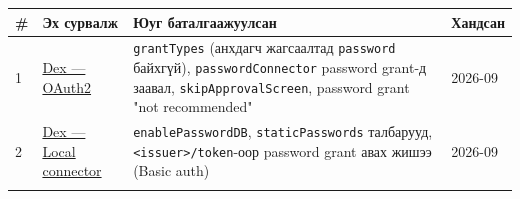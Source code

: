 \begingroup\scriptsize\begin{longtable}[]{@{}llll@{}}
\toprule
\begin{minipage}[b]{0.22\columnwidth}\raggedright
\#\strut
\end{minipage} & \begin{minipage}[b]{0.22\columnwidth}\raggedright
Эх сурвалж\strut
\end{minipage} & \begin{minipage}[b]{0.22\columnwidth}\raggedright
Юуг баталгаажуулсан\strut
\end{minipage} & \begin{minipage}[b]{0.22\columnwidth}\raggedright
Хандсан\strut
\end{minipage}\tabularnewline
\midrule
\endhead
\begin{minipage}[t]{0.22\columnwidth}\raggedright
1\strut
\end{minipage} & \begin{minipage}[t]{0.22\columnwidth}\raggedright
\href{https://dexidp.io/docs/configuration/oauth2/}{Dex --- OAuth2}\strut
\end{minipage} & \begin{minipage}[t]{0.22\columnwidth}\raggedright
\texttt{grantTypes} (анхдагч жагсаалтад \texttt{password} байхгүй), \texttt{passwordConnector} password grant-д заавал, \texttt{skipApprovalScreen}, password grant "not recommended"\strut
\end{minipage} & \begin{minipage}[t]{0.22\columnwidth}\raggedright
2026-09\strut
\end{minipage}\tabularnewline
\begin{minipage}[t]{0.22\columnwidth}\raggedright
2\strut
\end{minipage} & \begin{minipage}[t]{0.22\columnwidth}\raggedright
\href{https://dexidp.io/docs/connectors/local/}{Dex --- Local connector}\strut
\end{minipage} & \begin{minipage}[t]{0.22\columnwidth}\raggedright
\texttt{enablePasswordDB}, \texttt{staticPasswords} талбарууд, \texttt{\textless{}issuer\textgreater{}/\allowbreak{}token}-оор password grant авах жишээ (Basic auth)\strut
\end{minipage} & \begin{minipage}[t]{0.22\columnwidth}\raggedright
2026-09\strut
\end{minipage}\tabularnewline
\begin{minipage}[t]{0.22\columnwidth}\raggedright

\end{minipage}
\end{longtable}
